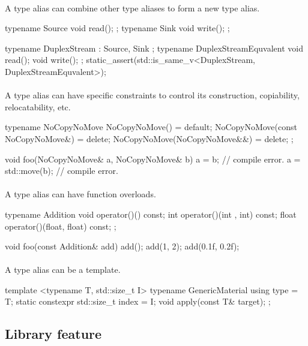 \documentclass{article}
\begin{document}
\paragraph{}
A type alias can combine other type aliases to form a new type alias.
\begin{codeblock}
typename Source{ void read(); };
typename Sink{ void write(); };

typename DuplexStream : Source, Sink {};
typename DuplexStreamEquvalent {
  void read();
  void write();
};
static_assert(std::is_same_v<DuplexStream, DuplexStreamEquvalent>);
\end{codeblock}

\paragraph{}
A type alias can have specific constraints to control its construction, copiability, relocatability, etc.
\begin{codeblock}
typename NoCopyNoMove {
  NoCopyNoMove() = default;
  NoCopyNoMove(const NoCopyNoMove&) = delete;
  NoCopyNoMove(NoCopyNoMove&&) = delete;
};

void foo(NoCopyNoMove& a, NoCopyNoMove& b) {
  a = b; // compile error.
  a = std::move(b); // compile error.
}
\end{codeblock}

\paragraph{}
A type alias can have function overloads.

\begin{codeblock}
typename Addition {
  void operator()() const;
  int operator()(int , int) const;
  float operator()(float, float) const;
};

void foo(const Addition& add) {
  add();
  add(1, 2);
  add(0.1f, 0.2f);
}
\end{codeblock}

\paragraph{}
A type alias can be a template.
\begin{codeblock}
template <typename T, std::size_t I>
typename GenericMaterial {
  using type = T;
  static constexpr std::size_t index = I;
  void apply(const T& target);
};
\end{codeblock}

\subsection{Library feature}
\end{document}
